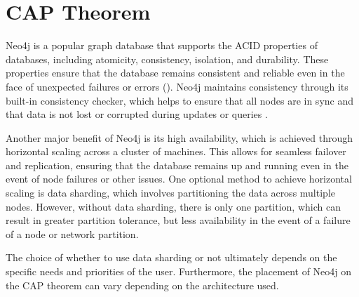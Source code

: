 
\section{CAP Theorem}

Neo4j is a popular graph database that supports the ACID properties of databases, including atomicity, consistency, isolation, and durability. These properties ensure that the database remains consistent and reliable even in the face of unexpected failures or errors (\cite{neo4j:acid}). Neo4j maintains consistency through its built-in consistency checker, which helps to ensure that all nodes are in sync and that data is not lost or corrupted during updates or queries \cite{neo4j:consistency-checker}.

Another major benefit of Neo4j is its high availability, which is achieved through horizontal scaling across a cluster of machines. This allows for seamless failover and replication, ensuring that the database remains up and running even in the event of node failures or other issues. One optional method to achieve horizontal scaling is data sharding, which involves partitioning the data across multiple nodes. However, without data sharding, there is only one partition, which can result in greater partition tolerance, but less availability in the event of a failure of a node or network partition. \cite{book:scaling-neo4j}

The choice of whether to use data sharding or not ultimately depends on the specific needs and priorities of the user. Furthermore, the placement of Neo4j on the CAP theorem can vary depending on the architecture used. 
